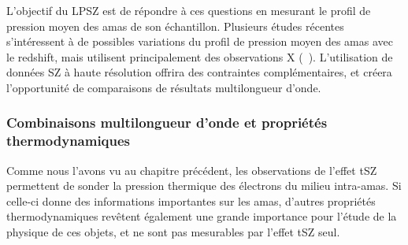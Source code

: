 L'objectif du LPSZ est de répondre à ces questions en mesurant le profil de pression moyen des amas de son échantillon.
Plusieurs études récentes s'intéressent à de possibles variations du profil de pression moyen des amas avec le redshift, mais utilisent principalement des observations X (\eg\ \cite{mcdonald_redshift_2014, ghirardini_evolution_2021}).
L'utilisation de données SZ à haute résolution offrira des contraintes complémentaires, et créera l'opportunité de comparaisons de résultats multilongueur d'onde.

\subsubsection{Combinaisons multilongueur d'onde et propriétés thermodynamiques} %
Comme nous l'avons vu au chapitre précédent, les observations de l'effet tSZ permettent de sonder la pression thermique des électrons du milieu intra-amas.
Si celle-ci donne des informations importantes sur les amas, d'autres propriétés thermodynamiques revêtent également une grande importance pour l'étude de la physique de ces objets, et ne sont pas mesurables par l'effet tSZ seul.


